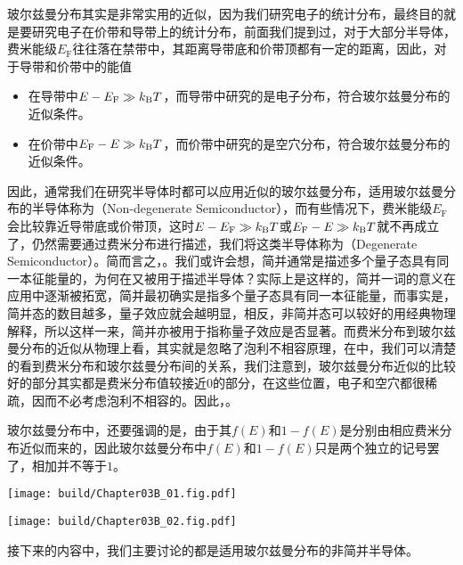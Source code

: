 玻尔兹曼分布其实是非常实用的近似，因为我们研究电子的统计分布，最终目的就是要研究电子在价带和导带上的统计分布，前面我们提到过，对于大部分半导体，费米能级$E_\text{F}$往往落在禁带中，其距离导带底和价带顶都有一定的距离，因此，对于导带和价带中的能值
\begin{itemize}
    \item 在导带中$E-E_\text{F}\gg k_\text{B} T$，而导带中研究的是电子分布，符合玻尔兹曼分布的近似条件。
    \item 在价带中$E_\text{F}-E\gg k_\text{B} T$，而价带中研究的是空穴分布，符合玻尔兹曼分布的近似条件。
\end{itemize}
因此，通常我们在研究半导体时都可以应用近似的玻尔兹曼分布，适用玻尔兹曼分布的半导体称为（Non-degenerate Semiconductor），而有些情况下，费米能级$E_\text{F}$会比较靠近导带底或价带顶，这时$E-E_\text{F}\gg k_\text{B} T$或$E_\text{F}-E\gg k_\text{B} T$就不再成立了，仍然需要通过费米分布进行描述，我们将这类半导体称为（Degenerate Semiconductor）。简而言之，。我们或许会想，简并通常是描述多个量子态具有同一本征能量的，为何在又被用于描述半导体？实际上是这样的，简并一词的意义在应用中逐渐被拓宽，简并最初确实是指多个量子态具有同一本征能量，而事实是，简并态的数目越多，量子效应就会越明显，相反，非简并态可以较好的用经典物理解释，所以这样一来，简并亦被用于指称量子效应是否显著\cite{W10}。而费米分布到玻尔兹曼分布的近似从物理上看，其实就是忽略了泡利不相容原理，在中，我们可以清楚的看到费米分布和玻尔兹曼分布间的关系，我们注意到，玻尔兹曼分布近似的比较好的部分其实都是费米分布值较接近$0$的部分，在这些位置，电子和空穴都很稀疏，因而不必考虑泡利不相容的。因此，。

玻尔兹曼分布中，还要强调的是，由于其$f(E)$和$1-f(E)$是分别由相应费米分布近似而来的，因此玻尔兹曼分布中$f(E)$和$1-f(E)$只是两个独立的记号罢了，相加并不等于$1$。

\begin{Figure}[费米分布与玻尔兹曼分布]
    \vspace{-0.15cm}
    \begin{FigureSub}[电子的统计分布]
        \texttt{[image: build/Chapter03B\_01.fig.pdf]}\vspace{-0.15cm}
    \end{FigureSub}\vspace{0.3cm}
    \begin{FigureSub}[空穴的统计分布]
        \texttt{[image: build/Chapter03B\_02.fig.pdf]}\vspace{-0.15cm}
    \end{FigureSub}
\end{Figure}

接下来的内容中，我们主要讨论的都是适用玻尔兹曼分布的非简并半导体。